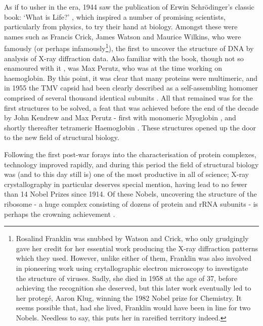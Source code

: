 \documentclass[a4paper,11pt,twoside,openright]{scrbook}
\begin{document}
As if to usher in the era, 1944 saw the publication of Erwin Schrödinger's classic book: `What is Life?' \cite{Schrodinger1947}, which inspired a number of promising scientists, particularly from physics, to try their hand at biology. Amongst these were names such as Francis Crick, James Watson and Maurice Wilkins, who were famously (or perhaps infamously\footnote{ Rosalind Franklin was snubbed by Watson and Crick, who only grudgingly gave her credit for her essential work producing the X-ray diffraction patterns which they used. However, unlike either of them, Franklin was also involved in pioneering work using crytallographic electron microscopy to investigate the structure of viruses. Sadly, she died in 1958 at the age of 37, before achieving the recognition she deserved, but this later work eventually led to her proteg{\'e},  Aaron Klug, winning the 1982 Nobel prize for Chemistry. It seems possible that, had she lived, Franklin would have been in line for two Nobels. Needless to say, this puts her in rareified territory indeed.}), the first to uncover the structure of DNA by analysis of X-ray diffraction data. Also familiar with the book, though not so enamoured with it \cite{Dronamraju1999}, was Max Perutz, who was at the time working on haemoglobin. By this point, it was clear that many proteins were multimeric, and in 1955 the TMV capsid had been clearly described as a self-assembling homomer comprised of several thousand identical subunits \cite{Fraenkel-Conrat1955}. All that remained was for the first structures to be solved, a feat that was achieved before the end of the decade by John Kendrew and Max Perutz - first with monomeric Myoglobin \cite{Kendrew1958}, and shortly thereafter tetrameric Haemoglobin \cite{Perutz1960}. These structures opened up the door to the new field of structural biology.

Following the first post-war forays into the characterisation of protein complexes, technology improved rapidly, and during this period the field of structural biology was (and to this day still is) one of the most productive in all of science; X-ray crystallography in particular deserves special mention, having lead to no fewer than 14 Nobel Prizes since 1914. Of these Nobels, uncovering the structure of the ribosome - a huge complex consisting of dozens of protein and rRNA subunits - is perhaps the crowning achievement \cite{Schluenzen2000,Ramakrishnan2000,Ban2000}.
\end{document}
